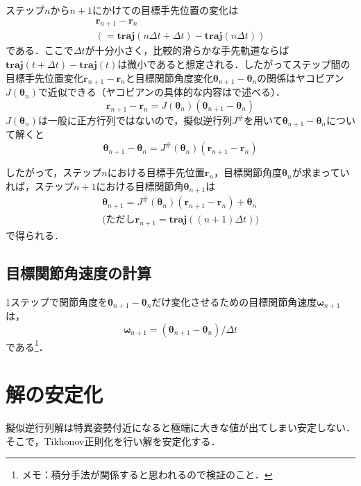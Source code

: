 \documentclass[a4paper,10pt, twocolumn, fleqn]{jsarticle}
\begin{document}
ステップ$n$から$n+1$にかけての目標手先位置の変化は
\begin{gather*}
\bm{r}_{n+1} - \bm{r}_n \\
( = \bm{traj}(n\varDelta t+\varDelta t) - \bm{traj}(n\varDelta t) )
\end{gather*}
である．ここで$\varDelta t$が十分小さく，比較的滑らかな手先軌道ならば$\bm{traj}(t+\varDelta t) - \bm{traj}(t)$は微小であると想定される．したがってステップ間の目標手先位置変化$\bm{r}_{n+1} - \bm{r}_n$と目標関節角度変化$\bm{\theta}_{n+1} - \bm{\theta}_n$の関係はヤコビアン$J(\bm{\theta}_n)$で近似できる（ヤコビアンの具体的な内容はで述べる）．
\begin{equation*}
\bm{r}_{n+1} - \bm{r}_n = J(\bm{\theta}_n) (\bm{\theta}_{n+1} - \bm{\theta}_n)
\end{equation*}
$J(\bm{\theta}_n)$は一般に正方行列ではないので，擬似逆行列$J^\#$を用いて$\bm{\theta}_{n+1} - \bm{\theta}_n$について解くと
\begin{equation*}
\bm{\theta}_{n+1} - \bm{\theta}_n = J^\#(\bm{\theta}_n) (\bm{r}_{n+1} - \bm{r}_n)
\end{equation*}

したがって，ステップ$n$における目標手先位置$\bm{r}_n$，目標関節角度$\bm{\theta}_n$が求まっていれば，ステップ$n+1$における目標関節角$\bm{\theta}_{n+1}$は
\begin{gather*}
\bm{\theta}_{n+1} = J^\#(\bm{\theta}_n) (\bm{r}_{n+1} - \bm{r}_n) + \bm{\theta}_n \\
\text{(ただし$\bm{r}_{n+1} = \bm{traj}((n+1)\varDelta t)$)}
\end{gather*}
で得られる．


\subsection{目標関節角速度の計算}

1ステップで関節角度を$\bm{\theta}_{n+1} - \bm{\theta}_n$だけ変化させるための目標関節角速度$\bm{\omega}_{n+1}$は，
\begin{equation*}
\bm{\omega}_{n+1} = (\bm{\theta}_{n+1} - \bm{\theta}_n) / \varDelta t
\end{equation*}
である\footnote{メモ：積分手法が関係すると思われるので検証のこと．}．


\section{解の安定化}

擬似逆行列解は特異姿勢付近になると極端に大きな値が出てしまい安定しない．そこで，Tikhonov正則化を行い解を安定化する．
\end{document}
